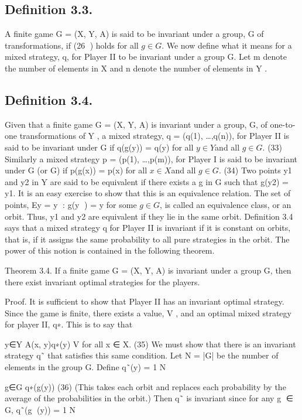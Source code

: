 \documentclass[]{report}
\begin{document}
\subsection{Definition 3.3.} A finite game G = (X, Y, A) is said to be invariant under a group, G of
transformations, if (26
) holds for all $g \in G$.
We now define what it means for a mixed strategy, q, for Player II to be invariant
under a group G. Let m denote the number of elements in X and n denote the number of
elements in Y .
\subsection{Definition 3.4.} Given that a finite game G = (X, Y, A) is invariant under a group, G,
of one-to-one transformations of Y , a mixed strategy, q = (q(1), \ldots,q(n)), for Player II is
said to be invariant under G if
q(g(y)) = q(y) for all $ y \in Y$and all $g \in G$. (33)
Similarly a mixed strategy p = (p(1), \ldots,p(m)), for Player I is said to be invariant under
G (or G) if
p(g(x)) = p(x) for all $ x \in X$and all $g \in G$. (34)
Two points y1 and y2 in Y are said to be equivalent if there exists a g in G such that
g(y2) = y1. It is an easy exercise to show that this is an equivalence relation. The set of
points, Ey = {y : g(y
) = y for some $g \in G$}, is called an equivalence class, or an orbit.
Thus, y1 and y2 are equivalent if they lie in the same orbit. Definition 3.4 says that a mixed
strategy q for Player II is invariant if it is constant on orbits, that is, if it assigns the same
probability to all pure strategies in the orbit. The power of this notion is contained in the
following theorem.
\begin{framed}
Theorem 3.4. If a finite game G = (X, Y, A) is invariant under a group G, then there
exist invariant optimal strategies for the players.
\end{framed}
Proof. It is sufficient to show that Player II has an invariant optimal strategy. Since the
game is finite, there exists a value, V , and an optimal mixed strategy for player II, q∗.
This is to say that


y∈Y
A(x, y)q∗(y) \leq V for all x ∈ X. (35)
We must show that there is an invariant strategy q˜ that satisfies this same condition. Let
N = |G| be the number of elements in the group G. Define
q˜(y) = 1
N


g∈G
q∗(g(y)) (36)
(This takes each orbit and replaces each probability by the average of the probabilities in
the orbit.) Then q˜ is invariant since for any g ∈ G,
q˜(g
(y)) = 1
N
\end{document}
